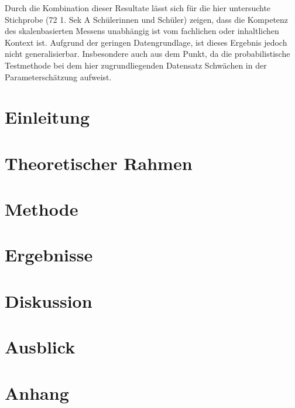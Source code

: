 \documentclass[12pt,oneside, DIV11]{scrbook}
\begin{document}
Durch die Kombination dieser Resultate lässt sich für die hier untersuchte Stichprobe (72 1. Sek A Schülerinnen und Schüler) zeigen, dass die Kompetenz des skalenbasierten Messens unabhängig ist vom fachlichen oder inhaltlichen Kontext ist. Aufgrund der geringen Datengrundlage, ist dieses Ergebnis jedoch nicht generalisierbar. Insbesondere auch aus dem Punkt, da die probabilistische Testmethode bei dem hier zugrundliegenden Datensatz Schwächen in der Parameterschätzung aufweist.






\mainmatter


\chapter{Einleitung}

\chapter{Theoretischer Rahmen}

\chapter{Methode}

\chapter{Ergebnisse}

\chapter{Diskussion}

\chapter{Ausblick}



\appendix 



\backmatter	

\printbibliography[heading=bibintoc]

\chapter{Anhang}

\end{document}
